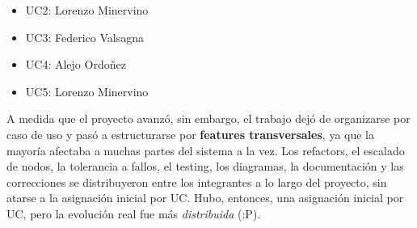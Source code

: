 \documentclass[12pt,a4paper]{article}
\begin{document}
\begin{itemize}
    \item UC2: Lorenzo Minervino
    \item UC3: Federico Valsagna
    \item UC4: Alejo Ordoñez
    \item UC5: Lorenzo Minervino
\end{itemize}

A medida que el proyecto avanzó, sin embargo, el trabajo dejó de
organizarse por caso de uso y pasó a estructurarse por \textbf{features
transversales}, ya que la mayoría afectaba a muchas partes del sistema a la
vez. Los refactors, el escalado de nodos, la tolerancia a fallos, el
testing, los diagramas, la documentación y las correcciones se distribuyeron
entre los integrantes a lo largo del proyecto, sin atarse a la asignación
inicial por UC. Hubo, entonces, una asignación inicial por UC, pero la
evolución real fue más \textit{distribuida} (:P).
\end{document}

